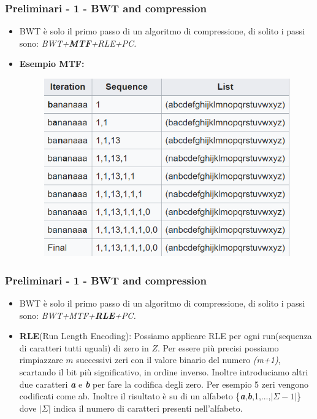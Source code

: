 \documentclass{beamer}
\begin{document}
\begin{frame}
\frametitle{Preliminari - 1 - BWT and compression}
\begin{itemize}
	\item BWT è solo il primo passo di un algoritmo di compressione, di solito i passi sono: \textit{BWT+\textbf{MTF}+RLE+PC.}
	\item \textbf{Esempio MTF:}
	\begin{figure}[H]
		\centering
		\includegraphics[scale=0.5]{Immagini/MTFExample}
	\end{figure}
	
\end{itemize}
\end{frame}

\begin{frame}
\frametitle{Preliminari - 1 - BWT and compression}
\begin{itemize}
	\item BWT è solo il primo passo di un algoritmo di compressione, di solito i passi sono: \textit{BWT+MTF+\textbf{RLE}+PC.}
	\item \textbf{RLE}(Run Length Encoding): Possiamo applicare RLE per ogni run(sequenza di caratteri tutti uguali) di zero in $ Z $. Per essere più precisi possiamo rimpiazzare $ m $ successivi zeri con il valore binario del numero \textit{(m+1)}, scartando il bit più significativo, in ordine inverso. Inoltre introduciamo altri due caratteri\textit{ \textbf{a}} e \textit{\textbf{b}}  per fare la codifica degli zero. Per esempio 5 zeri vengono codificati come ab. Inoltre il risultato è su di un alfabeto \{\textbf{\textit{a}},\textbf{\textit{b}},1,...,$|\Sigma-1|$\}  dove $|\Sigma|$ indica il numero di caratteri presenti nell'alfabeto.
\end{itemize}
\end{frame}
\end{document}
